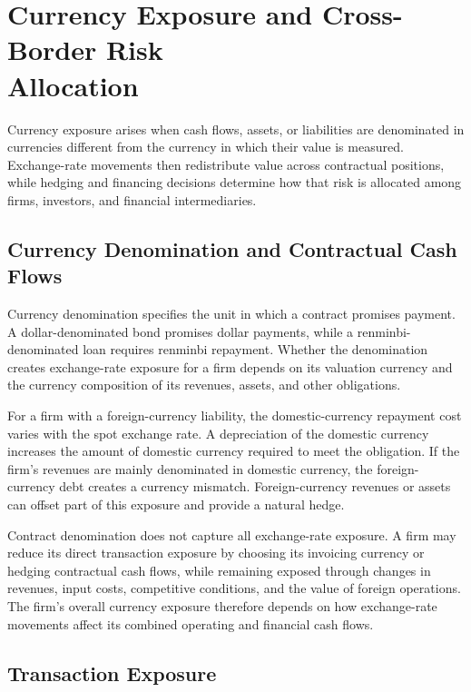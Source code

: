 \section[Currency Exposure and Cross-Border Risk Allocation]{Currency Exposure and Cross-Border Risk\\ Allocation}

Currency exposure arises when cash flows, assets, or liabilities are denominated in currencies different from the currency in which their value is measured. Exchange-rate movements then redistribute value across contractual positions, while hedging and financing decisions determine how that risk is allocated among firms, investors, and financial intermediaries.

\subsection{Currency Denomination and Contractual Cash Flows}

Currency denomination specifies the unit in which
a contract promises payment. A dollar-denominated
bond promises dollar payments, while a
renminbi-denominated loan requires renminbi
repayment. Whether the denomination creates
exchange-rate exposure for a firm depends on its
valuation currency and the currency composition
of its revenues, assets, and other obligations.

For a firm with a foreign-currency liability,
the domestic-currency repayment cost varies with
the spot exchange rate. A depreciation of the
domestic currency increases the amount of domestic
currency required to meet the obligation. If the
firm's revenues are mainly denominated in domestic
currency, the foreign-currency debt creates a
currency mismatch. Foreign-currency revenues or
assets can offset part of this exposure and provide
a natural hedge.

Contract denomination does not capture all
exchange-rate exposure. A firm may reduce its
direct transaction exposure by choosing its
invoicing currency or hedging contractual cash
flows, while remaining exposed through changes
in revenues, input costs, competitive conditions,
and the value of foreign operations. The firm's
overall currency exposure therefore depends on
how exchange-rate movements affect its combined
operating and financial cash flows.


\subsection{Transaction Exposure}


